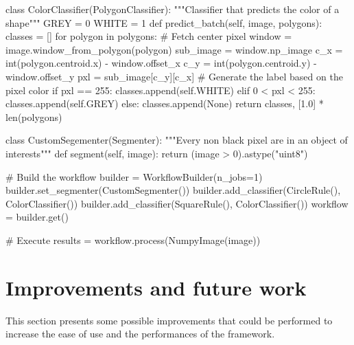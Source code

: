 \begin{python}[language=python,label={lst:toy_classify},caption={Toy example - Classifier}] 
class ColorClassifier(PolygonClassifier):
    """Classifier that predicts the color of a shape"""
    GREY = 0
    WHITE = 1
    def predict_batch(self, image, polygons):
        classes = []
        for polygon in polygons:
            # Fetch center pixel
            window = image.window_from_polygon(polygon)
            sub_image = window.np_image
            c_x = int(polygon.centroid.x) - window.offset_x
            c_y = int(polygon.centroid.y) - window.offset_y
            pxl = sub_image[c_y][c_x]
            # Generate the label based on the pixel color
            if pxl == 255:
                classes.append(self.WHITE)
            elif 0 < pxl < 255:
                classes.append(self.GREY)
            else:
                classes.append(None)
        return classes, [1.0] * len(polygons)

\end{python}

\begin{python}[language=python,label={lst:toy_segment},caption={Toy example - Segmentation implementation}] 
class CustomSegementer(Segmenter):
    """Every non black pixel are in an object of interests"""
    def segment(self, image):
        return (image > 0).astype("uint8")
\end{python}

\begin{python}[language=python,label={lst:toy_build_and_call},caption={Toy example - Applying the framework}] 
# Build the workflow
builder = WorkflowBuilder(n_jobs=1)
builder.set_segmenter(CustomSegmenter())
builder.add_classifier(CircleRule(), ColorClassifier())
builder.add_classifier(SquareRule(), ColorClassifier())
workflow = builder.get()

# Execute
results = workflow.process(NumpyImage(image))
\end{python}

\section{Improvements and future work}
This section presents some possible improvements that could be performed to increase the ease of use and the performances of the framework. 

